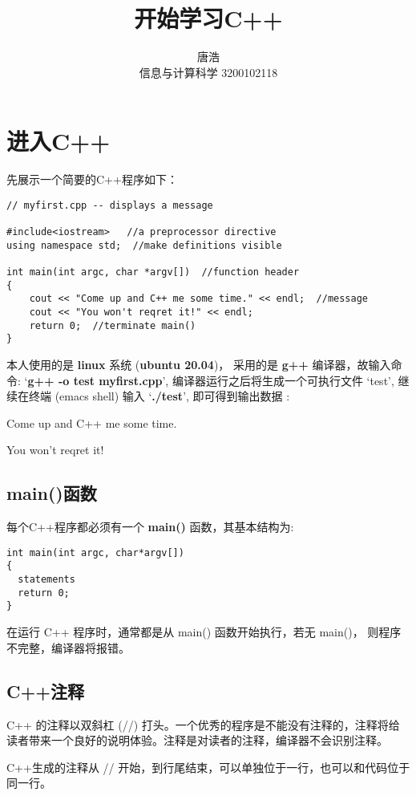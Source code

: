 \documentclass[10pt,a4paper,fleqn]{ctexart}
\title{开始学习C++}
\author{唐浩 \\ 信息与计算科学 3200102118}
\begin{document}
\maketitle
\tableofcontents
{}

\section{进入C++}

先展示一个简要的C++程序如下：
\begin{verbatim}
// myfirst.cpp -- displays a message

#include<iostream>   //a preprocessor directive
using namespace std;  //make definitions visible

int main(int argc, char *argv[])  //function header
{
    cout << "Come up and C++ me some time." << endl;  //message
    cout << "You won't reqret it!" << endl;
    return 0;  //terminate main()
}
\end{verbatim}

本人使用的是 {\bf linux} 系统 ({\bf ubuntu 20.04})， 采用的是 {\bf g++} 编译器，故输入命令: `{\bf g++ -o test myfirst.cpp}', 编译器运行之后将生成一个可执行文件 `test', 继续在终端 (emacs shell) 输入 `{\bf ./test}', 即可得到输出数据 :

Come up and C++ me some time.

You won't reqret it!

\subsection{main()函数}

每个C++程序都必须有一个 {\bf main()} 函数，其基本结构为:

\begin{verbatim}
int main(int argc, char*argv[])
{
  statements
  return 0;
}
\end{verbatim}

在运行 C++ 程序时，通常都是从 main() 函数开始执行，若无 main()， 则程序不完整，编译器将报错。

\subsection{C++注释}
C++ 的注释以双斜杠 (//) 打头。一个优秀的程序是不能没有注释的，注释将给读者带来一个良好的说明体验。注释是对读者的注释，编译器不会识别注释。

C++生成的注释从 // 开始，到行尾结束，可以单独位于一行，也可以和代码位于同一行。
\end{document}
